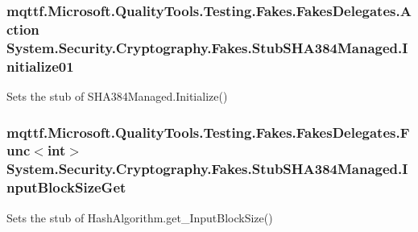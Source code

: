 \hypertarget{class_system_1_1_security_1_1_cryptography_1_1_fakes_1_1_stub_s_h_a384_managed_a904161d0fc0cddfcaeb68d54de8f3eda}{
\subsubsection[{Initialize01}]{\setlength{\rightskip}{0pt plus 5cm}mqttf.\-Microsoft.\-Quality\-Tools.\-Testing.\-Fakes.\-Fakes\-Delegates.\-Action System.\-Security.\-Cryptography.\-Fakes.\-Stub\-S\-H\-A384\-Managed.\-Initialize01}}\label{class_system_1_1_security_1_1_cryptography_1_1_fakes_1_1_stub_s_h_a384_managed_a904161d0fc0cddfcaeb68d54de8f3eda}


Sets the stub of S\-H\-A384\-Managed.\-Initialize()

\hypertarget{class_system_1_1_security_1_1_cryptography_1_1_fakes_1_1_stub_s_h_a384_managed_adb04afc61d28ee92f534912602c4a4f9}{
\subsubsection[{Input\-Block\-Size\-Get}]{\setlength{\rightskip}{0pt plus 5cm}mqttf.\-Microsoft.\-Quality\-Tools.\-Testing.\-Fakes.\-Fakes\-Delegates.\-Func$<$int$>$ System.\-Security.\-Cryptography.\-Fakes.\-Stub\-S\-H\-A384\-Managed.\-Input\-Block\-Size\-Get}}\label{class_system_1_1_security_1_1_cryptography_1_1_fakes_1_1_stub_s_h_a384_managed_adb04afc61d28ee92f534912602c4a4f9}


Sets the stub of Hash\-Algorithm.\-get\-\_\-\-Input\-Block\-Size()

